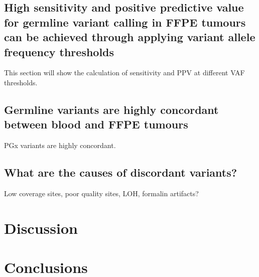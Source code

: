 \documentclass{bmcart}
\begin{document}
\subsection*{High sensitivity and positive predictive value for germline variant calling in FFPE tumours can be achieved through applying variant allele frequency thresholds}
This section will show the calculation of sensitivity and PPV at different VAF thresholds.

\subsection*{Germline variants are highly concordant between blood and FFPE tumours}
PGx variants are highly concordant.

\subsection*{What are the causes of discordant variants?}
Low coverage sites, poor quality sites, LOH, formalin artifacts?

\section*{Discussion}

\section*{Conclusions}

\end{document}
